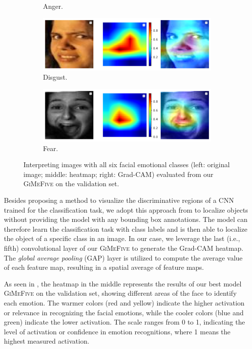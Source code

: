 \begin{figure}[ht]
\begin{subfigure}{0.47\linewidth}
    \caption{Anger.}
    \label{fig:xai4}
  \end{subfigure}
  \hfill
  \begin{subfigure}{0.47\linewidth}
    \includegraphics[width=\linewidth]{xai_disgust.png}
    \caption{Disgust.}
    \label{fig:xai5}
  \end{subfigure}
  \hfill
  \begin{subfigure}{0.47\linewidth}
    \includegraphics[width=\linewidth]{xai_fear.png}
    \caption{Fear.}
    \label{fig:xai6}
  \end{subfigure}
  \caption{Interpreting images with all six facial emotional classes (left: original image; middle: heatmap; right: Grad-CAM) evaluated from our \textsc{GiMeFive} on the validation set.}
  \label{fig:xai}
\end{figure}

Besides proposing a method to visualize the discriminative regions of a CNN trained for the classification task, 
we adopt this approach from \citet{ZhouKLOT16} to localize objects without providing the model with any bounding box annotations. 
The model can therefore learn the classification task with class labels and is then able to localize the object of a specific class in an image. 
In our case, we leverage the last (i.e., fifth) convolutional layer of our \textsc{GiMeFive} to generate the Grad-CAM heatmap. 
The \textit{global average pooling} 
(GAP) layer is utilized to compute the average value of each feature map, 
resulting in a spatial average of feature maps.

As seen in , 
the heatmap in the middle represents the results of our best model \textsc{GiMeFive} on the validation set, 
showing different areas of the face to identify each emotion. 
The warmer colors (red and yellow) indicate the higher activation or relevance in recognizing the facial emotions, 
while the cooler colors (blue and green) indicate the lower activation. 
The scale ranges from 0 to 1, 
indicating the level of activation or confidence in emotion recognitions,
where 1 means the highest measured activation. 

